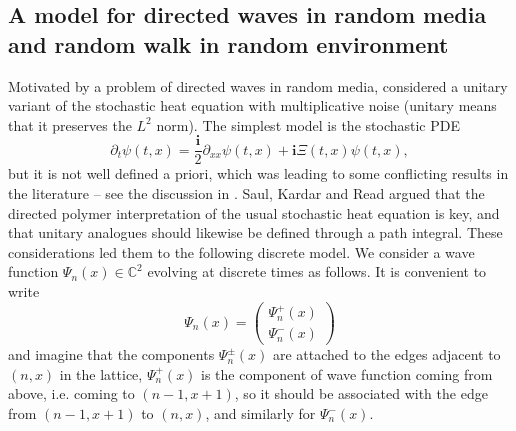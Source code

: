 \documentclass[a4paper,11pt,oneside,reqno]{amsart}
\theoremstyle{definition}
\newcommand{\C}{\ensuremath{\mathbb{C}}}
\newcommand{\I}{\ensuremath{\mathbf{i}}}
\numberwithin{equation}{section}
\begin{document}
\subsection{A model for directed waves in random media and random walk in random environment}
Motivated by a problem of directed waves in random media, \cite{kardar1992} considered a unitary variant of the stochastic heat equation with multiplicative noise (unitary means that it preserves the $L^2$ norm). The simplest model is the stochastic PDE 
$$ \partial_t \psi(t,x) = \frac{\I}{2} \partial_{xx} \psi(t,x) + \I \Xi(t,x) \psi(t,x),$$
but it is not well defined a priori, which was leading to some conflicting results in the literature -- see the discussion in \cite{kardar1992}. Saul, Kardar and Read argued that the directed polymer interpretation of the usual stochastic heat equation is key, and that unitary analogues should likewise  be defined through a path integral. These considerations led them to the following discrete model. We consider a wave function $\Psi_n(x)\in \C^2$ evolving at discrete times as follows. It is convenient to write 
$$ \Psi_n(x) = \begin{pmatrix}
	\Psi_n^+(x) \\ \Psi_n^-(x)
\end{pmatrix} $$ 
and imagine that the components $\Psi_n^{\pm}(x)$ are attached to the edges adjacent to $(n,x)$ in the lattice, $\Psi_n^+(x)$ is the component of wave function coming from above, i.e. coming to $(n-1,x+1)$, so it should be associated with the edge from  $(n-1,x+1)$ to $(n,x)$, and similarly for $\Psi_n^-(x)$.  
\end{document}
